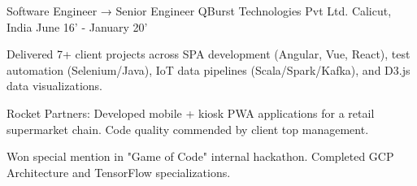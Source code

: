 \begin{cventries}
  \cventry
    {Software Engineer → Senior Engineer} %
    {QBurst Technologies Pvt Ltd.} %
    {Calicut, India} %
    {June 16' - January 20'} %
    {
		\begin{cvitems} %
			\item {Delivered 7+ client projects across SPA development (Angular, Vue, React), test automation (Selenium/Java), IoT data pipelines (Scala/Spark/Kafka), and D3.js data visualizations.}
			\item {Rocket Partners: Developed mobile + kiosk PWA applications for a retail supermarket chain. Code quality commended by client top management.}
			\item {Won special mention in "Game of Code" internal hackathon. Completed GCP Architecture and TensorFlow specializations.}
		\end{cvitems}
    }

\end{cventries}
